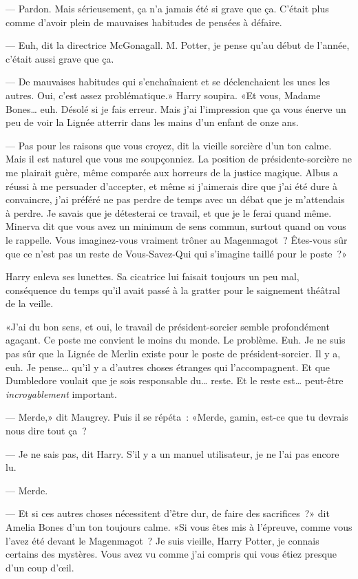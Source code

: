 --- Pardon. Mais sérieusement, ça n'a jamais été si grave que ça. C'était plus comme d'avoir plein de mauvaises habitudes de pensées à défaire.

--- Euh, dit la directrice McGonagall. M. Potter, je pense qu'au début de l'année, c'était aussi grave que ça.

--- De mauvaises habitudes qui s'enchaînaient et se déclenchaient les unes les autres. Oui, c'est assez problématique.» Harry soupira. «Et vous, Madame Bones… euh. Désolé si je fais erreur. Mais j'ai l'impression que ça vous énerve un peu de voir la Lignée atterrir dans les mains d'un enfant de onze ans.

--- Pas pour les raisons que vous croyez, dit la vieille sorcière d'un ton calme. Mais il est naturel que vous me soupçonniez. La position de présidente-sorcière ne me plairait guère, même comparée aux horreurs de la justice magique. Albus a réussi à me persuader d'accepter, et même si j'aimerais dire que j'ai été dure à convaincre, j'ai préféré ne pas perdre de temps avec un débat que je m'attendais à perdre. Je savais que je détesterai ce travail, et que je le ferai quand même. Minerva dit que vous avez un minimum de sens commun, surtout quand on vous le rappelle. Vous imaginez-vous vraiment trôner au Magenmagot~? Êtes-vous sûr que ce n'est pas un reste de Vous-Savez-Qui qui s'imagine taillé pour le poste~?»

Harry enleva ses lunettes. Sa cicatrice lui faisait toujours un peu mal, conséquence du temps qu'il avait passé à la gratter pour le saignement théâtral de la veille.

«J'ai du bon sens, et oui, le travail de président-sorcier semble profondément agaçant. Ce poste me convient le moins du monde. Le problème. Euh. Je ne suis pas sûr que la Lignée de Merlin existe pour le poste de président-sorcier. Il y a, euh. Je pense… qu'il y a d'autres choses étranges qui l'accompagnent. Et que Dumbledore voulait que je sois responsable du… reste. Et le reste est… peut-être \emph{incroyablement} important.

--- Merde,» dit Maugrey. Puis il se répéta~: «Merde, gamin, est-ce que tu devrais nous dire tout ça~?

--- Je ne sais pas, dit Harry. S'il y a un manuel utilisateur, je ne l'ai pas encore lu.

--- Merde.

--- Et si ces autres choses nécessitent d'être dur, de faire des sacrifices~?» dit Amelia Bones d'un ton toujours calme. «Si vous êtes mis à l'épreuve, comme vous l'avez été devant le Magenmagot~? Je suis vieille, Harry Potter, je connais certains des mystères. Vous avez vu comme j'ai compris qui vous étiez presque d'un coup d'œil.

